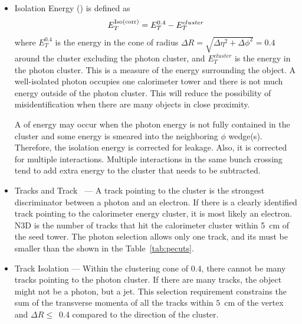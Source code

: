 \begin{singlespace}
\begin{itemize}
\item{Isolation Energy (\isoetcorr) is defined as
\begin{equation}
\isoetcorr = E_{T}^{0.4} - E_{T}^{cluster}
\end{equation}
\noindent where $ E_{T}^{0.4} $ is the energy in the cone of radius \mbox{$ \Delta R = \sqrt{\Delta \eta^2 + \Delta \phi^2 } = 0.4$} around the cluster excluding the photon cluster, and $ E_{T}^{cluster}$ is the energy in the photon cluster. This is a measure of the energy surrounding the object. A well-isolated photon occupies one calorimeter tower and there is not much energy outside of the photon cluster. This will reduce the possibility of misidentification when there are many objects in close proximity.

A  of energy may occur when the photon energy is not fully contained in the cluster and some energy is smeared into the neighboring $\phi$ wedge(s). Therefore, the isolation energy is corrected for leakage. Also, it is corrected for multiple interactions. Multiple interactions in the same bunch crossing tend to add extra energy to the cluster that needs to be subtracted.
}

\item{ Tracks and Track \pt\ --- A track pointing to the cluster is the strongest discriminator between a photon and an electron. If there is a clearly identified track pointing to the calorimeter energy cluster, it is most likely an electron. N3D is the number of tracks that hit the calorimeter cluster within 5~cm of the seed tower. The photon selection allows only one track, and its \pt must be smaller than the \pt shown in the Table~\ref{tab:pecuts}.
}

\item{Track Isolation --- Within the clustering cone of 0.4, there cannot be many tracks pointing to the photon cluster. If there are many tracks, the object might not be a photon, but a jet. This selection requirement constrains the sum of the transverse momenta of all the tracks within $5$~cm of the vertex and $\Delta R \leq$~0.4 compared to the direction of the cluster.
}


\end{itemize}
\end{singlespace}
